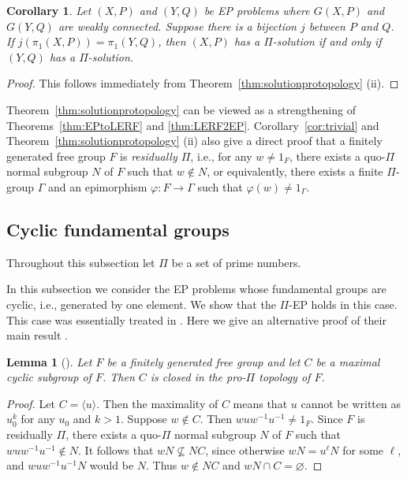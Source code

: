\documentclass[11pt]{amsart}
\newtheorem{corollary}[theorem]{Corollary}
\newtheorem{lemma}[theorem]{Lemma}
\theoremstyle{definition}
\theoremstyle{definition}
\numberwithin{equation}{section}
\begin{document}
\begin{corollary}\label{cor:fundgp} Let $(X, P)$ and $(Y, Q)$ be EP problems where $G(X, P)$ and $G(Y, Q)$ are weakly connected. Suppose there is a bijection $j$ between $P$ and $Q$. If $j(\pi_1(X, P))=\pi_1(Y, Q)$, then $(X, P)$ has a $\Pi$-solution if and only if $(Y, Q)$ has a $\Pi$-solution.
\end{corollary}

\begin{proof} This follows immediately from Theorem~\ref{thm:solutionprotopology} (ii).
\end{proof}

Theorem~\ref{thm:solutionprotopology} can be viewed as a strengthening of Theorems~\ref{thm:EPtoLERF} and \ref{thm:LERF2EP}.
Corollary~\ref{cor:trivial} and Theorem~\ref{thm:solutionprotopology} (ii) also give a direct proof that a finitely generated free group $F$ is {\em residually $\Pi$}, i.e., for any $w\neq 1_F$, there exists a quo-$\Pi$ normal subgroup $N$ of $F$ such that $w\not\in N$, or equivalently, there exists a finite $\Pi$-group $\Gamma$ and an epimorphism $\varphi\colon F\to \Gamma$ such that $\varphi(w)\neq 1_{\Gamma}$. 




\subsection{Cyclic fundamental groups} Throughout this subsection let $\Pi$ be a set of prime numbers.

In this subsection we consider the EP problems whose fundamental groups are cyclic, i.e., generated by one element. We show that the $\Pi$-EP holds in this case. This case was essentially treated in \cite{HPSW19}.
Here we give an alternative proof of their main result \cite[Theorem 1.5]{HPSW19}.

\begin{lemma} [{\cite[Lemma 9.1]{HPSW19}}]\label{lem:HPSW} Let $F$ be a finitely generated free group and let $C$ be a maximal cyclic subgroup of $F$. Then $C$ is closed in the pro-$\Pi$ topology of $F$. 
\end{lemma}

\begin{proof} Let $C=\langle u\rangle$. Then the maximality of $C$ means that $u$ cannot be written as $u_0^k$ for any $u_0$ and $k>1$. Suppose $w\not\in C$. Then $wuw^{-1}u^{-1}\neq 1_F$. Since $F$ is residually $\Pi$, there exists a quo-$\Pi$ normal subgroup $N$ of $F$ such that $wuw^{-1}u^{-1}\not\in N$. It follows that $wN\not\subseteq NC$, since otherwise $wN=u^\ell N$ for some $\ell$, and $wuw^{-1}u^{-1}N$ would be $N$. Thus $w\not\in NC$ and $wN\cap C=\varnothing$. 
\end{proof}
\end{document}
